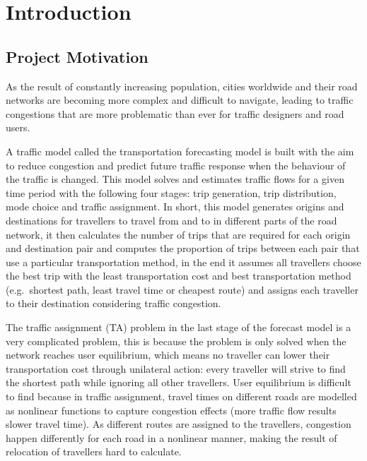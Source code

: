 \chapter{Introduction}



\section{Project Motivation}

As the result of constantly increasing population,
cities worldwide and their road networks are becoming
more complex and difficult to navigate,
leading to traffic congestions that are more problematic than ever
for traffic designers and road users.

A traffic model called the transportation forecasting model is built
with the aim to reduce congestion and predict future traffic response when the behaviour of the traffic is changed.
This model solves and estimates traffic flows for a given time period with the following four stages: trip generation,
trip distribution, mode choice and traffic assignment.  
In short,
this model generates origins and destinations for travellers to travel from and to in different parts of the road network,
it then calculates the number of trips that are required for each origin and destination pair
and computes the proportion of trips between each pair that use a particular transportation method,
in the end it assumes all travellers choose the best trip with the least transportation cost and best transportation method (e.g.\ shortest path, least travel time or cheapest route) and
assigns each traveller to their destination considering traffic congestion.

The traffic assignment (TA) problem in the last stage of the forecast model is a very complicated problem, 
this is because the problem is only solved when the network reaches user equilibrium,
which means no traveller can lower their transportation cost through unilateral action: every traveller will strive to find the shortest path while ignoring all other travellers.
User equilibrium is difficult to find because in traffic assignment,
travel times on different roads are modelled as nonlinear functions to capture congestion effects (more traffic flow results slower travel time).
As different routes are assigned to the travellers,
congestion happen differently for each road in a nonlinear manner,
making the result of relocation of travellers hard to calculate.

